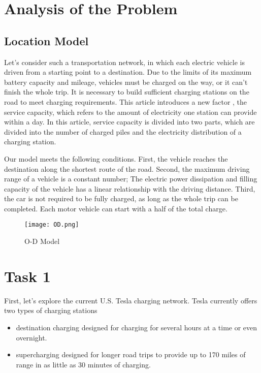 \documentclass{mcmthesis}
\begin{document}
\section{Analysis of the Problem}

\subsection {Location Model} 

 Let's consider such a transportation network, in which each electric vehicle is driven from a starting point to a destination. Due to the limits of its maximum battery capacity and mileage, vehicles must be charged on the way, or it can’t finish the whole trip. It is necessary to build sufficient charging stations on the road to meet charging requirements. This article introduces a new factor , the service capacity,  which refers to the amount of electricity one station can provide within a day.  In this article, service capacity is divided into two parts, which are divided into the number of charged piles and the electricity distribution of a charging station.

Our model meets the following conditions. First, the vehicle reaches the destination along the shortest route of the road. Second, the maximum driving range  of a vehicle is a constant number; The electric power dissipation and filling capacity of the vehicle has a linear relationship with the driving distance. Third, the car is not required to be fully charged, as long as the whole trip can be completed. Each motor vehicle can start with a half of the total charge.

\begin{figure}[htbp]
\small
\centering
\texttt{[image: OD.png]}
\caption{O-D Model} 
\end{figure}


\section{Task 1}

First, let's explore the current U.S. Tesla charging network. Tesla currently offers two types of charging stations


\begin{itemize}
\item destination charging designed for charging for several hours at a time or even overnight.
\item supercharging designed for longer road trips to provide up to 170 miles of range in as little as 30 minutes of charging.
\end{itemize}
\end{document}

